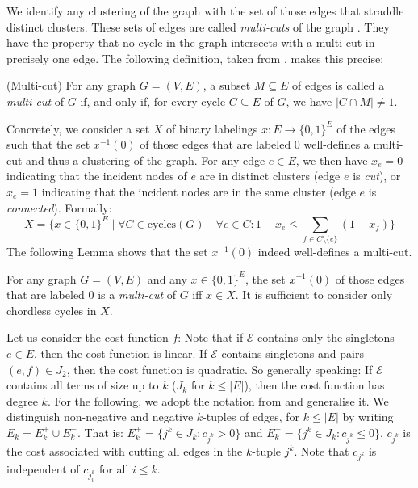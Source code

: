 We identify any clustering of the graph with the set of those edges that straddle distinct clusters. These sets of edges are called \textit{multi-cuts} of the graph \cite{Chopra}. They have the property that no cycle in the graph intersects with a multi-cut in precisely one edge. The following definition, taken from \cite{Andres}, makes this precise:
\begin{definition}{(Multi-cut)}
For any graph $G=(V,E)$, a subset $M \subseteq E$ of edges is called a \textit{multi-cut} of $G$ if, and only if, for every cycle $C \subseteq E$ of $G$, we have $|C \cap M| \neq 1$.
\end{definition}
Concretely, we consider a set $X$ of binary labelings $x: E \rightarrow \{0,1\}^E$ of the edges such that the set $x^{-1}(0)$ of those edges that are labeled $0$ well-defines a multi-cut and thus a clustering of the graph. For any edge $e \in E$, we then have $x_e=0$ indicating that the incident nodes of $e$ are in distinct clusters (edge $e$ is \textit{cut}), or $x_e=1$ indicating that the incident nodes are in the same cluster (edge $e$ is \textit{connected}). Formally: 
\begin{equation}
    X=\Bigg\{ x \in \{0,1\}^E \mid
   \forall C \in \text{cycles}(G) \quad \forall e \in C: 1-x_e \leq \sum_{f \in C \setminus \{e \}} (1-x_f) \Bigg\}
\end{equation}
The following Lemma shows that the set $x^{-1}(0)$ indeed well-defines a multi-cut. 
\begin{lemma}
For any graph $G = (V,E)$ and any $x \in \{0,1\}^E$, the set $x^{-1}(0)$ of those edges that are labeled $0$ is a \textit{multi-cut} of $G$ iff $x \in X$. It is sufficient to consider only chordless cycles in $X$.
\end{lemma}
 
Let us consider the cost function $f$: Note that if $\mathcal{E}$ contains only the singletons $e \in E$, then the cost function is linear. If $\mathcal{E}$ contains singletons and pairs $(e,f) \in J_2$, then the cost function is quadratic. So generally speaking: If $\mathcal{E}$ contains all terms of size up to $k$ ($J_k$ for $k \leq |E|$), then the cost function has degree $k$.
For the following, we adopt the notation from \cite{Comb} and generalise it.
We distinguish non-negative and negative $k$-tuples of edges, for $k \leq |E|$ by writing $E_k=E^+_k \cup E^-_k$. That is: $E^+_k= \{ j^k \in J_k: c_{j^k} >0 \}$ and $E^-_k= \{ j^k \in J_k: c_{j^k} \leq 0\}$. $c_{j^k}$ is the cost associated with cutting all edges in the $k$-tuple $j^k$. Note that $c_{j^k}$ is independent of $c_{j^k_i}$ for all $i \leq k$. 
